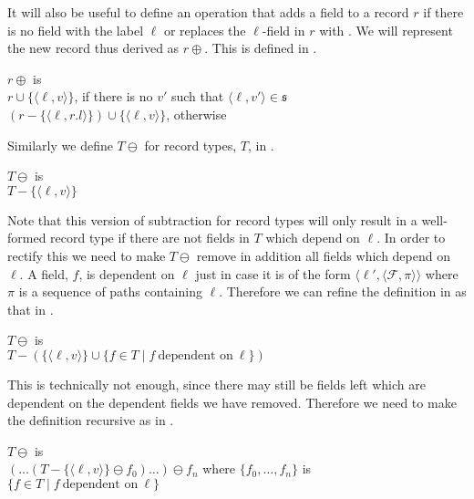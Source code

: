 It will also be useful to define an operation that adds a field
 to a record $r$ if there is no field
with the label $\ell$ or replaces the $\ell$-field in $r$ with
.  We will represent the new record
thus derived as $r\oplus$.  This
is defined in \nexteg{}.
\begin{ex} 
$r\oplus$ is \\
\hspace*{1em}$r\cup\{\langle\ell,v\rangle\}$, if there is no $v'$ such
that $\langle\ell,v'\rangle\in\mathfrak{s}$\\
\hspace*{1em}$(r-\{\langle\ell,r.l\rangle\})\cup\{\langle\ell,v\rangle\}$, otherwise 
\end{ex} 
Similarly we define $T\ominus$
for record types, $T$, in
\nexteg{}.
\begin{ex} 
$T\ominus$ is \\ 
\hspace*{1em}$T-\{\langle\ell,v\rangle\}$ 
\end{ex} 
Note that this version of subtraction for record types will only
result in a well-formed record type if there are not fields in $T$
which depend on $\ell$.  In order to rectify this we need to make
$T\ominus$ remove in addition
all fields which depend on $\ell$.  A field, $f$, is dependent on $\ell$
just in case it is of the form
$\langle\ell',\langle\mathcal{F},\pi\rangle\rangle$ where $\pi$ is a
sequence of paths containing $\ell$. Therefore we can refine the
definition in \preveg{} as that in \nexteg{}.
\begin{ex} 
$T\ominus$ is \\ 
\hspace*{1em}$T-(\{\langle\ell,v\rangle\}\cup\{f\in T\mid f\
\text{dependent on}\ \ell\})$ 
\end{ex} 
This is technically not enough, since there may still be fields left
which are dependent on the dependent fields we have removed.
Therefore we need to make the definition recursive as in \nexteg{}.
\begin{ex} 
$T\ominus$ is \\ 
\hspace*{1em}$(\ldots(T-\{\langle\ell,v\rangle\}\ominus
f_0)\ldots)\ominus f_n$ where $\{f_0,\ldots,f_n\}$ is $\{f\in T\mid f\
\text{dependent on}\ \ell\}$ 
\end{ex}   

